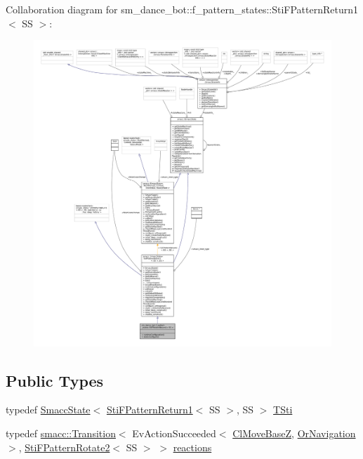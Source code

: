 Collaboration diagram for sm\+\_\+dance\+\_\+bot\+:\+:f\+\_\+pattern\+\_\+states\+:\+:Sti\+F\+Pattern\+Return1$<$ SS $>$\+:
\nopagebreak
\begin{figure}[H]
\begin{center}
\leavevmode
\includegraphics[width=350pt]{structsm__dance__bot_1_1f__pattern__states_1_1StiFPatternReturn1__coll__graph}
\end{center}
\end{figure}
\subsection*{Public Types}
\begin{DoxyCompactItemize}
\item 
typedef \hyperlink{classSmaccState}{Smacc\+State}$<$ \hyperlink{structsm__dance__bot_1_1f__pattern__states_1_1StiFPatternReturn1}{Sti\+F\+Pattern\+Return1}$<$ SS $>$, SS $>$ \hyperlink{structsm__dance__bot_1_1f__pattern__states_1_1StiFPatternReturn1_afd0d5d7e8dc6ad87f7314176d86d919e}{T\+Sti}
\item 
typedef \hyperlink{classsmacc_1_1Transition}{smacc\+::\+Transition}$<$ Ev\+Action\+Succeeded$<$ \hyperlink{classmove__base__z__client_1_1ClMoveBaseZ}{Cl\+Move\+BaseZ}, \hyperlink{classsm__dance__bot_1_1OrNavigation}{Or\+Navigation} $>$, \hyperlink{structsm__dance__bot_1_1f__pattern__states_1_1StiFPatternRotate2}{Sti\+F\+Pattern\+Rotate2}$<$ SS $>$ $>$ \hyperlink{structsm__dance__bot_1_1f__pattern__states_1_1StiFPatternReturn1_a6d7ebf9aae079085114a9c018a78d19a}{reactions}
\end{DoxyCompactItemize}
